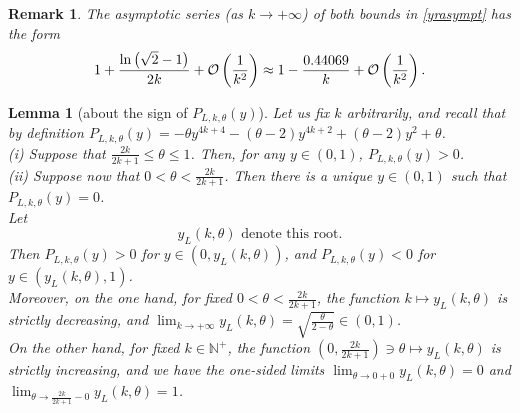 \documentclass[a4paper]{article}
\newtheorem{lemma}{Lemma}
\newtheorem{remark}{Remark}
\newcommand{\te}{\theta}
\newcommand{\yl}{y_L(k,\theta)}
\newcommand{\nplus}{\mathbb{N}^+}
\newcommand{\Pol}{P_{L,k,\te}(y)}
\begin{document}
\begin{remark}
The asymptotic series (as $k\to+\infty$) of both bounds in \eqref{yrasympt} has the form
\[
1+\frac{\ln \left(\sqrt{2}-1\right)}{2 k}+{\cal{O}}\left(\frac{1}{k^2}\right)\approx 
1-\frac{0.44069}{k}+{\cal{O}}\left(\frac{1}{k^2}\right).
\]
\end{remark}






\begin{lemma}[about the sign of $\Pol$]\label{lem4} Let us fix $k$ arbitrarily, and recall that by definition 
$\Pol=-\theta  y^{4 k+4}-(\theta -2) y^{4 k+2}+(\theta -2) y^2+\theta$.\\
(i) Suppose that $\frac{2k}{2k+1}\le\te\le1$. Then, for any $y\in(0,1)$, $\Pol>0$.\\
(ii) Suppose now that $0<\te<\frac{2k}{2k+1}$. Then there is a unique $y\in(0,1)$ such that $\Pol=0$.\\ 
Let 
\begin{equation}\label{yldef}\yl \text{ denote this root.}\end{equation} 
Then $\Pol>0$ for $y\in(0,\yl)$, and $\Pol<0$ for $y\in(\yl,1)$.\\
Moreover, on the one hand, for fixed $0<\te<\frac{2k}{2k+1}$, the function $k\mapsto\yl$ is strictly decreasing, and $\lim_{k\to+\infty} \yl=\sqrt{\frac{\te}{2-\te}}\in(0,1)$.\\
On the other hand, for fixed $k\in\nplus$, the function $\left(0,\frac{2k}{2k+1}\right)\ni\te\mapsto\yl$ is strictly increasing, and we have the one-sided limits $\lim_{\te\to0+0} \yl=0$ and $\lim_{\te\to\frac{2k}{2k+1}-0} \yl=1$.
\end{lemma}
\end{document}
